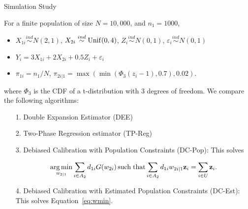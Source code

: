 \documentclass[final]{beamer}
\DeclareMathOperator*{\argmin}{arg\,min}
\DeclareMathOperator*{\suchthat}{such\; that}
\newlength{\colwidth}
\begin{document}
\begin{frame}[t]
\begin{columns}[t]
\begin{column}{\colwidth}

  \begin{block}{Simulation Study}

  For a finite population of size $N = 10,000$, and $n_1 = 1000$,

  \begin{itemize}
    \item $X_{1i} \stackrel{ind}{\sim} N(2, 1)$,
      $X_{2i} \stackrel{ind}{\sim} \rm{Unif}(0, 4)$,
      $Z_{i} \stackrel{ind}{\sim} N(0, 1)$,
      $\varepsilon_i \stackrel{ind}{\sim} N(0, 1)$
    \item $Y_{i} = 3 X_{1i} + 2 X_{2i} + 0.5 Z_i + \varepsilon_i$
    \item $\pi_{1i} = n_1 / N$,
      $\pi_{2i|1} = \max(\min(\Phi_3(z_{i} - 1), 0.7), 0.02)$.
  \end{itemize}

  where $\Phi_3$ is the CDF of a t-distribution with 3 degrees of freedom. We
  compare the following algorithms:

  \begin{itemize}
    \item[1.] Double Expansion Estimator (DEE)
    \item[2.] Two-Phase Regression estimator (TP-Reg)
    \item[3.] Debiased Calibration with Population Constraints (DC-Pop): This 
      solves 

    \begin{equation*}
      \argmin_{w_{2|1}} \sum_{i \in A_2} d_{1i} G(w_{2i}) \suchthat
      \sum_{i \in A_2} d_{1i} w_{2i|1} {\bf z}_i = \sum_{i \in U} {\bf z}_i.
    \end{equation*}

    \item[4.] Debiased Calibration with Estimated Population Constraints (DC-Est):
      This solves Equation~\eqref{eq:wmin}.
  \end{itemize}

  \begin{table}[ht!]
    \centering
  
  \caption{This table shows the results of the simulation study. It displays the
  Bias, RMSE, empirical 95\% confidence interval, and a t-statistic assessing the
  unbiasedness of each estimator for the estimators: DEE, TP-Reg, DC-Pop, and
  DC-Est.}
  \label{tab:tpdc-mean}
  \end{table}
  \end{block}


\end{column}
\end{columns}
\end{frame}
\end{document}
